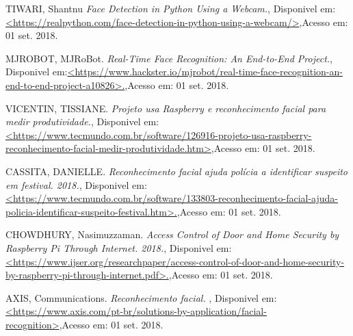 \documentclass[conference,compsoc]{IEEEtran}
\begin{document}

\begin{thebibliography}{1}




{TIWARI, Shantnu
\emph{Face Detection in Python Using a Webcam.},
 {Disponivel em:\url{<https://realpython.com/face-detection-in-python-using-a-webcam/>}},{Acesso em: 01 set. 2018.}
}

{MJROBOT, MJRoBot.
\emph{Real-Time Face Recognition: An End-to-End Project.},
 {Disponivel em:\url{<https://www.hackster.io/mjrobot/real-time-face-recognition-an-end-to-end-project-a10826>.}},{Acesso em: 01 set. 2018.}
}

{VICENTIN, TISSIANE.
\emph{Projeto usa Raspberry e reconhecimento facial para medir produtividade.},
 {Disponivel em:\url{<https://www.tecmundo.com.br/software/126916-projeto-usa-raspberry-reconhecimento-facial-medir-produtividade.htm>}},{Acesso em: 01 set. 2018.}
}

{CASSITA, DANIELLE.
\emph{Reconhecimento facial ajuda polícia a identificar suspeito em festival. 2018.},
 {Disponivel em:\url{<https://www.tecmundo.com.br/software/133803-reconhecimento-facial-ajuda-policia-identificar-suspeito-festival.htm>.}},{Acesso em: 01 set. 2018.}
}

{CHOWDHURY, Nasimuzzaman.
\emph{Access Control of Door and Home Security by Raspberry Pi Through Internet. 2018.},
 {Disponivel em:\url{<https://www.ijser.org/researchpaper/access-control-of-door-and-home-security-by-raspberry-pi-through-internet.pdf>.}},{Acesso em: 01 set. 2018.}
}

{AXIS, Communications.
\emph{Reconhecimento facial. },
 {Disponivel em:\url{<https://www.axis.com/pt-br/solutions-by-application/facial-recognition>}},{Acesso em: 01 set. 2018.}
}


\end{thebibliography}




\end{document}
